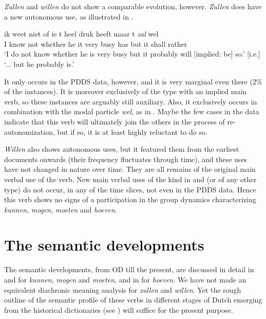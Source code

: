 \documentclass[output=paper]{langsci/langscibook}
\begin{document}
\textit{Zullen} and \textit{willen} do not show a comparable evolution, however. \textit{Zullen} does have a new autonomous use, as illustrated in .

\ea%
    \label{ex:nuyts:11}
    \gll          ik weet niet of ie {\textquotesingle}t heel druk heeft maar {\textquotesingle}t \textit{zal} wel\\
  I know not whether he it very busy has but it shall rather\\
\glt   [lit.] `I do not know whether he is very busy but it probably will [implied: be] so.' [i.e.] `... but he probably is.'
\z

\noindent It only occurs in the PDDS data, however, and it is very marginal even there (2\% of the instances). It is moreover exclusively of the type with an implied main verb, so these instances are arguably still auxiliary. Also, it exclusively occurs in combination with the modal particle \textit{wel}, as in . Maybe the few cases in the data indicate that this verb will ultimately join the others in the process of re-autonomization, but if so, it is at least highly reluctant to do so.

\textit{Willen} also shows autonomous uses, but it featured them from the earliest documents onwards (their frequency fluctuates through time), and these uses have not changed in nature over time. They are all remains of the original main verbal use of the verb. New main verbal uses of the kind in  and  (or of any other type) do not occur, in any of the time slices, not even in the PDDS data. Hence this verb shows no signs of a participation in the group dynamics characterizing \textit{kunnen}, \textit{mogen}, \textit{moeten} and \textit{hoeven}.

\section{The semantic developments} \label{nuyts:5}

The semantic developments, from OD till the present, are discussed in detail in \citet{BylooNuyts2014} and \citet{NuytsByloo2015} for \textit{kunnen}, \textit{mogen} and \textit{moeten}, and in \citet{NuytsEtAl2018} for \textit{hoeven}. We have not made an equivalent diachronic meaning analysis for \textit{zullen} and \textit{willen}. Yet the rough outline of the semantic profile of these verbs in different stages of Dutch emerging from the historical dictionaries (see ) will suffice for the present purpose.
\end{document}
